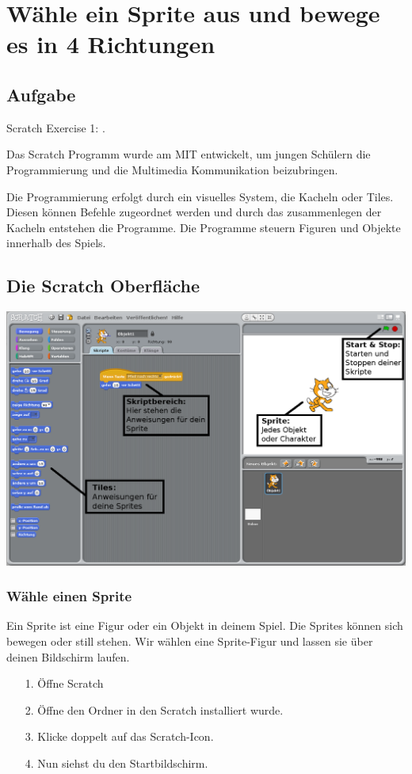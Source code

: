\section{Wähle ein Sprite aus und bewege es in 4 Richtungen}
\subsection{Aufgabe}
Scratch Exercise 1: .

Das Scratch Programm wurde am MIT entwickelt, um jungen Schülern die Programmierung und die Multimedia Kommunikation beizubringen. 

Die Programmierung erfolgt durch ein visuelles System, die Kacheln oder Tiles. Diesen können Befehle zugeordnet werden und durch das zusammenlegen der Kacheln entstehen die Programme. Die Programme steuern Figuren und Objekte innerhalb des Spiels.


\subsection{Die Scratch Oberfläche}
\includegraphics[width=\textwidth]{images/aufgabe1_uebersicht.png}

\subsubsection{Wähle einen Sprite}

Ein Sprite ist eine Figur oder ein Objekt in deinem Spiel. Die Sprites können sich bewegen oder still stehen. Wir wählen eine Sprite-Figur und lassen sie über deinen Bildschirm laufen.
\begin{itemize}
\item[1.] Öffne Scratch
\item[2.] Öffne den Ordner in den Scratch installiert wurde.
\item[3.] Klicke doppelt auf das Scratch-Icon.
\item[4.] Nun siehst du den Startbildschirm.
\end{itemize}

